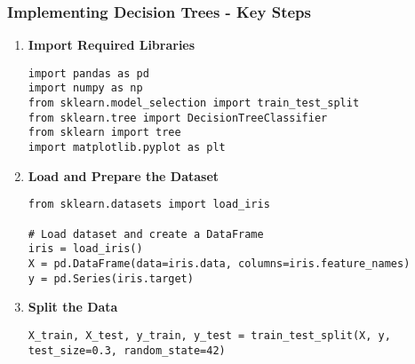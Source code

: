 \documentclass{beamer}
\begin{document}
\begin{frame}[fragile]
    \frametitle{Implementing Decision Trees - Key Steps}
    \begin{enumerate}
        \item \textbf{Import Required Libraries}
            \begin{lstlisting}
import pandas as pd
import numpy as np
from sklearn.model_selection import train_test_split
from sklearn.tree import DecisionTreeClassifier
from sklearn import tree
import matplotlib.pyplot as plt
            \end{lstlisting}

        \item \textbf{Load and Prepare the Dataset}
            \begin{lstlisting}
from sklearn.datasets import load_iris

# Load dataset and create a DataFrame
iris = load_iris()
X = pd.DataFrame(data=iris.data, columns=iris.feature_names)
y = pd.Series(iris.target)
            \end{lstlisting}

        \item \textbf{Split the Data}
            \begin{lstlisting}
X_train, X_test, y_train, y_test = train_test_split(X, y, test_size=0.3, random_state=42)
            \end{lstlisting}
    \end{enumerate}
\end{frame}
\end{document}
